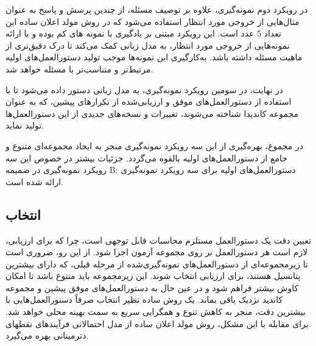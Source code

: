 در رویکرد دوم نمونه‌گیری، علاوه بر توصیف مسئله، از چندین پرسش و پاسخ به عنوان مثال‌هایی از خروجی مورد انتظار استفاده می‌شود که در روش مولد اعلان ساده این تعداد 5 عدد است. این رویکرد مبتنی بر یادگیری با نمونه های کم \cite{FSL} بوده و با ارائه نمونه‌هایی از خروجی مورد انتظار، به مدل زبانی کمک می‌کند تا درک دقیق‌تری از ماهیت مسئله داشته باشد. به‌کارگیری این نمونه‌ها موجب تولید دستورالعمل‌های اولیه مرتبط‌تر و متناسب‌تر با مسئله خواهد شد.

در نهایت، در سومین رویکرد نمونه‌گیری، به مدل زبانی دستور داده می‌شود تا با استفاده از دستورالعمل‌های موفق و ارزیابی‌شده از تکرارهای پیشین، که به عنوان مجموعه کاندیدا شناخته می‌شوند، تغییرات و نسخه‌های جدیدی از این دستورالعمل‌ها تولید نماید.

در مجموع، بهره‌گیری از این سه رویکرد نمونه‌گیری منجر به ایجاد مجموعه‌ای متنوع و جامع از دستورالعمل‌های اولیه بالقوه می‌گردد. جزئیات بیشتر در خصوص این سه رویکرد نمونه‌گیری در ضمیمه B: دستورالعمل‌های اولیه برای سه رویکرد نمونه‌گیری ارائه شده است.

\subsection{انتخاب}

تعیین دقت یک دستورالعمل مستلزم محاسبات قابل توجهی است، چرا که برای ارزیابی، لازم است هر دستورالعمل بر روی مجموعه آزمون اجرا شود. 
از این رو، ضروری است تا زیرمجموعه‌ای از دستورالعمل‌های نمونه‌گیری‌شده از مرحله قبلی، که دارای بیشترین پتانسیل هستند، برای ارزیابی انتخاب شوند.
این زیرمجموعه باید متنوع باشد تا امکان کاوش بیشتر فراهم شود و در عین حال به دستورالعمل‌های موفق پیشین و مجموعه کاندید نزدیک باقی بماند.
یک روش ساده نظیر انتخاب صرفاً دستورالعمل‌هایی با بیشترین دقت، منجر به کاهش تنوع و همگرایی سریع به سمت بهینه محلی خواهد شد.
برای مقابله با این مشکل، روش مولد اعلان ساده از مدل احتمالاتی فرآیندهای نقطه\/ای دترمینانی بهره می‌گیرد.

